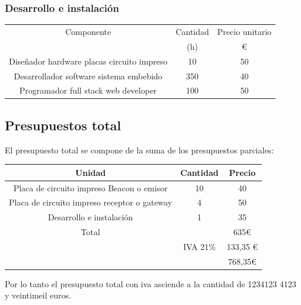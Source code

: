 \documentclass[paper=a4, fontsize=11pt,twoside]{scrartcl}	%
\begin{document}
            \subsubsection{Desarrollo e instalación}
            \begin{center}
                \begin{tabular}{||c | c |c ||} 
                \hline
                Componente & Cantidad  & Precio unitario  \\ [0.5ex] 
                 & (h) & € \\ [0.5ex] 
                \hline\hline
                    Diseñador hardware placas circuito impreso   & 10  & 50 \\ 
                    Desarrollador  software sistema embebido     & 350 & 40 \\ 
                    Programador full stack web developer         & 100 & 50 \\ 
                \hline
                \end{tabular}
            \end{center}
    \subsection{Presupuestos total}
        El presupuesto total se compone de la suma de los presupuestos parciales:
        \begin{center}
            \begin{tabular}{||c | c |c ||} 
            \hline
            Unidad & Cantidad & Precio  \\ [0.5ex] 
            \hline\hline
            Placa de circuito impreso Beacon o emisor & 10 & 40 \\ 
            Placa de circuito impreso receptor o gateway & 4 & 50 \\ 
            Desarrollo e instalación & 1 & 35 \\ 
            \hline
            \hline
            Total &  & 635€ \\ 
             & IVA 21\%& 133,35 € \\ 
             & & 768,35€ \\ 
            \hline
            \end{tabular}
        \end{center}
        Por lo tanto el presupuesto total con iva asciende a la cantidad de 1234123 4123 y veintimeil euros.
\end{document}
